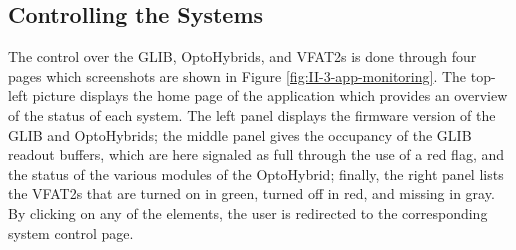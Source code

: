     \subsection{Controlling the Systems}

      The control over the GLIB, OptoHybrids, and VFAT2s is done through four pages which screenshots are shown in Figure \ref{fig:II-3-app-monitoring}. The top-left picture displays the home page of the application which provides an overview of the status of each system. The left panel displays the firmware version of the GLIB and OptoHybrids; the middle panel gives the occupancy of the GLIB readout buffers, which are here signaled as full through the use of a red flag, and the status of the various modules of the OptoHybrid; finally, the right panel lists the VFAT2s that are turned on in green, turned off in red, and missing in gray. By clicking on any of the elements, the user is redirected to the corresponding system control page. \\

